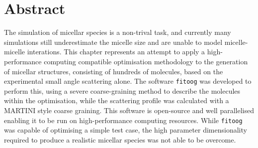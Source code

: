 \section*{Abstract}
The simulation of micellar species is a non-trival task, and currently many simulations still underestimate the micelle size and are unable to model micelle-micelle interations.
This chapter represents an attempt to apply a high-performance computing compatible optimisation methodology to the generation of micellar structures, consisting of hundreds of molecules, based on the experimental small angle scattering alone.
The software \texttt{fitoog} was developed to perform this, using a severe coarse-graining method to describe the molecules within the optimisation, while the scattering profile was calculated with a MARTINI style coarse graining.
This software is open-source and well parallelised enabling it to be run on high-performance computing resources.
While \texttt{fitoog} was capable of optimising a simple test case, the high parameter dimensionality required to produce a realistic micellar species was not able to be overcome. 
